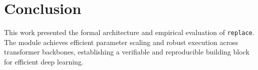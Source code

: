\section{Conclusion}
This work presented the formal architecture and empirical evaluation of \texttt{replace}. The module achieves efficient parameter scaling and robust execution across transformer backbones, establishing a verifiable and reproducible building block for efficient deep learning.

